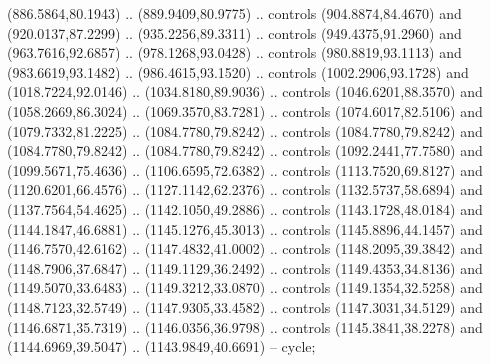 \begin{scope}[shift={(-127.26916,-608.18524)}]
\begin{scope}
\begin{scope}[shift={(-190.60299,773.9938)},opacity=0.500,transparency group]
        (886.5864,80.1943) .. (889.9409,80.9775) .. controls (904.8874,84.4670) and
        (920.0137,87.2299) .. (935.2256,89.3311) .. controls (949.4375,91.2960) and
        (963.7616,92.6857) .. (978.1268,93.0428) .. controls (980.8819,93.1113) and
        (983.6619,93.1482) .. (986.4615,93.1520) .. controls (1002.2906,93.1728) and
        (1018.7224,92.0146) .. (1034.8180,89.9036) .. controls (1046.6201,88.3570) and
        (1058.2669,86.3024) .. (1069.3570,83.7281) .. controls (1074.6017,82.5106) and
        (1079.7332,81.2225) .. (1084.7780,79.8242) .. controls (1084.7780,79.8242) and
        (1084.7780,79.8242) .. (1084.7780,79.8242) .. controls (1092.2441,77.7580) and
        (1099.5671,75.4636) .. (1106.6595,72.6382) .. controls (1113.7520,69.8127) and
        (1120.6201,66.4576) .. (1127.1142,62.2376) .. controls (1132.5737,58.6894) and
        (1137.7564,54.4625) .. (1142.1050,49.2886) .. controls (1143.1728,48.0184) and
        (1144.1847,46.6881) .. (1145.1276,45.3013) .. controls (1145.8896,44.1457) and
        (1146.7570,42.6162) .. (1147.4832,41.0002) .. controls (1148.2095,39.3842) and
        (1148.7906,37.6847) .. (1149.1129,36.2492) .. controls (1149.4353,34.8136) and
        (1149.5070,33.6483) .. (1149.3212,33.0870) .. controls (1149.1354,32.5258) and
        (1148.7123,32.5749) .. (1147.9305,33.4582) .. controls (1147.3031,34.5129) and
        (1146.6871,35.7319) .. (1146.0356,36.9798) .. controls (1145.3841,38.2278) and
        (1144.6969,39.5047) .. (1143.9849,40.6691) -- cycle;


\end{scope}
\end{scope}
\end{scope}

